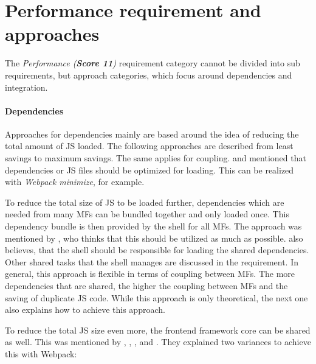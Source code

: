 
\section{Performance requirement and approaches}\label{cha:requirement_detail_performance}

The \textit{Performance (\textbf{Score 11})} requirement category cannot be divided into sub requirements, but approach categories, which focus around dependencies and integration.



\paragraph{Dependencies}

Approaches for dependencies mainly are based around the idea of reducing the total amount of \ac{JS} loaded.
The following approaches are described from least savings to maximum savings.
The same applies for coupling.
\textciteRehm{} and \textciteSteyer{} mentioned that dependencies or \ac{JS} files should be optimized for loading.
This can be realized with \textit{Webpack minimize}\footnotemark, for example.

To reduce  the total size of \ac{JS} to be loaded further, dependencies which are needed from many \acp{MF} can be bundled together and only loaded once.
This dependency bundle is then provided by the shell for all \acp{MF}.
The approach was mentioned by \textcite{Grijzen.2019}, who thinks that this should be utilized as much as possible.
\textciteSteyer{} also believes, that the shell should be responsible for loading the shared dependencies.
Other shared tasks that the shell manages are discussed in the \textit{} requirement.
In general, this approach is flexible in terms of coupling between \acp{MF}.
The more dependencies that are shared, the higher the coupling between \acp{MF} and the saving of duplicate \ac{JS} code.
While this approach is only theoretical, the next one also explains how to achieve this approach.

To reduce the total \ac{JS} size even more, the frontend framework core can be shared as well.
This was mentioned by \textciteSteyer{}, \textciteRehm{}, \textcite{Grijzen.2019}, \textcite{Dornenburg.2019} and \textcite{Leitner.2020}.
They explained two variances to achieve this with Webpack:

